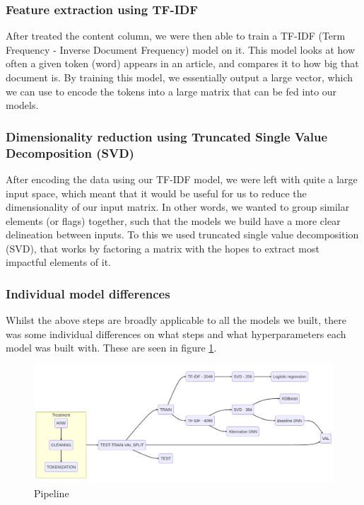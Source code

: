 \subsubsection{Feature extraction using TF-IDF}
After treated the content column, we were then able to train a TF-IDF (Term Frequency - Inverse Document Frequency)
model on it. This model looks at how often a given token (word) appears in an article, and compares it to how big that
document is. By training this model, we essentially output a large vector, which we can use to encode the tokens into a
large matrix that can be fed into our models.

\subsubsection{Dimensionality reduction using Truncated Single Value Decomposition (SVD)}
After encoding the data using our TF-IDF model, we were left with quite a large input space, which meant that it would
be useful for us to reduce the dimensionality of our input matrix. In other words, we wanted to group similar elements
(or flags) together, such that the models we build have a more clear delineation between inputs. To this we used
truncated single value decomposition (SVD), that works by factoring a matrix with the hopes to extract most impactful
elements of it.

\subsubsection{Individual model differences}
Whilst the above steps are broadly applicable to all the models we built, there was some individual differences on what
steps and what hyperparameters each model was built with. These are seen in figure \ref{fig:pipeline}.

\begin{figure}[htpb]
  \centering
  \includegraphics[width=1\textwidth]{pipeline}
  \caption{Pipeline}
  \label{fig:pipeline}
\end{figure}

